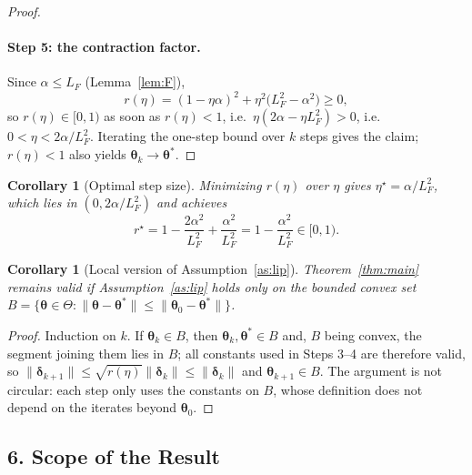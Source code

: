 \documentclass{article}
\newtheorem{corollary}[theorem]{Corollary}
\theoremstyle{definition}
\theoremstyle{remark}
\begin{document}
\begin{proof}
\paragraph{Step 5: the contraction factor.}
Since $\alpha \le L_F$ (Lemma~\ref{lem:F}),
\begin{equation}
r(\eta) = (1 - \eta \alpha)^{2} + \eta^{2}\big(L_F^{2} - \alpha^{2}\big) \ge 0,
\end{equation}
so $r(\eta) \in [0,1)$ as soon as $r(\eta) < 1$, i.e.\ $\eta(2\alpha - \eta L_F^{2}) > 0$, i.e.\
$0 < \eta < 2\alpha / L_F^{2}$. Iterating the one-step bound over $k$ steps gives the claim; $r(\eta) < 1$
also yields $\boldsymbol{\theta}_k \to \boldsymbol{\theta}^*$.
\end{proof}

\begin{corollary}[Optimal step size]
Minimizing $r(\eta)$ over $\eta$ gives $\eta^\star = \alpha / L_F^{2}$, which lies in $(0, 2\alpha/L_F^{2})$ and
achieves
\begin{equation}
r^\star = 1 - \frac{2\alpha^{2}}{L_F^{2}} + \frac{\alpha^{2}}{L_F^{2}}
= 1 - \frac{\alpha^{2}}{L_F^{2}} \in [0, 1).
\end{equation}
\end{corollary}

\begin{corollary}[Local version of Assumption~\ref{as:lip}]\label{cor:local}
Theorem~\ref{thm:main} remains valid if Assumption~\ref{as:lip} holds only on the bounded convex set
$B = \{\boldsymbol{\theta} \in \Theta : \|\boldsymbol{\theta} - \boldsymbol{\theta}^*\| \le \|\boldsymbol{\theta}_0 - \boldsymbol{\theta}^*\|\}$.
\end{corollary}

\begin{proof}
Induction on $k$. If $\boldsymbol{\theta}_k \in B$, then $\boldsymbol{\theta}_k, \boldsymbol{\theta}^* \in B$ and,
$B$ being convex, the segment joining them lies in $B$; all constants used in Steps 3--4 are therefore valid, so
$\|\boldsymbol{\delta}_{k+1}\| \le \sqrt{r(\eta)} \|\boldsymbol{\delta}_k\| \le \|\boldsymbol{\delta}_k\|$ and
$\boldsymbol{\theta}_{k+1} \in B$. The argument is not circular: each step only uses the constants on $B$, whose
definition does not depend on the iterates beyond $\boldsymbol{\theta}_0$.
\end{proof}

\subsection*{6. Scope of the Result}
\end{document}
